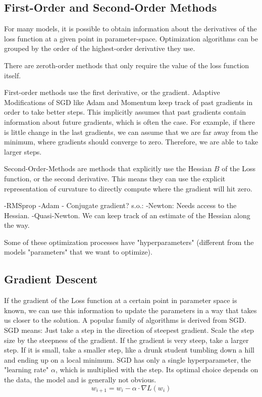 \documentclass[twoside,12pt,a4paper]{report}
\newcommand{\done}[2][]{\todo[color=green!40, #1]{\textbf{Done:} #2}}
\begin{document}
\subsection{First-Order and Second-Order Methods}
For many models, it is possible to obtain information about the derivatives of the loss function  at a given point in parameter-space. Optimization algorithms can be grouped by the order of the highest-order derivative they use.

There are zeroth-order methods that only require the value of the loss function itself. 

First-order methods use the first derivative, or the gradient. Adaptive Modifications of SGD like Adam and Momentum keep track of past gradients in order to take better steps. This implicitly assumes that past gradients contain information about future gradients, which is often the case. For example, if there is little change in the last gradients, we can assume that we are far away from the minimum, where gradients should converge to zero. Therefore, we are able to take larger steps.

Second-Order-Methods are methods that explicitly use the Hessian $B$ of the Loss function, or the second derivative. This means they can use the explicit representation of curvature to directly compute where the gradient will hit zero.

-RMSprop
-Adam
- Conjugate gradient?
s.o.:
-Newton: Needs access to the Hessian.
-Quasi-Newton.
We can keep track of an estimate of the Hessian along the way.


Some of these optimization processes have "hyperparameters" (different from the models "parameters" that we want to optimize).

\subsection{Gradient Descent}
If the gradient of the Loss function at a certain point in parameter space is known, we can use this information to update the parameters in a way that takes us closer to the solution. A popular family of algorithms is derived from SGD. SGD means: Just take a step in the direction of steepest gradient. Scale the step size by the steepness of the gradient. If the gradient is very steep, take a larger step. If it is small, take a smaller step, like a drunk student tumbling down a hill and ending up on a local minimum.
SGD has only a single hyperparameter, the "learning rate" $\alpha$, which is multiplied with the step. Its optimal choice depends on the data, the model and is generally not obvious.
\done{formula: Update Rule}
$$w_{i+1} = w_i - \alpha \cdot \nabla L(w_i) $$
\end{document}
